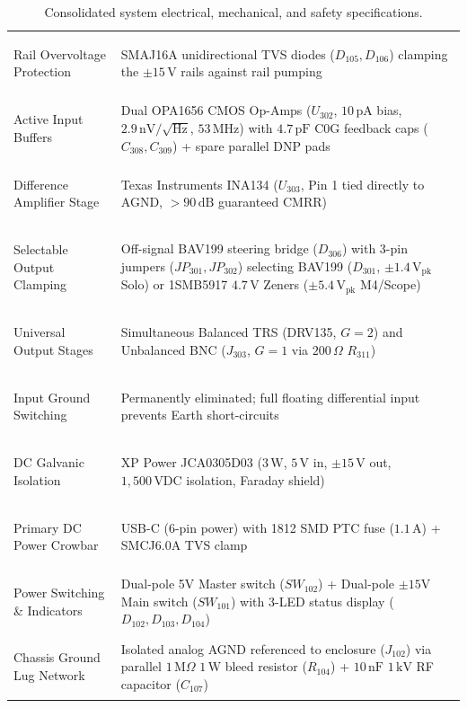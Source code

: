 \documentclass[11pt, letterpaper]{article}
\begin{document}
\begin{table}[H]
\begin{tabularx}{\linewidth}{@{} >{\bfseries\raggedright\arraybackslash}p{4.3cm} L @{}}
        Rail Overvoltage Protection & SMAJ16A unidirectional TVS diodes ($D_{105}, D_{106}$) clamping the $\pm 15\,\text{V}$ rails against rail pumping \\
        Active Input Buffers & Dual OPA1656 CMOS Op-Amps ($U_{302}$, $10\,\text{pA}$ bias, $2.9\,\text{nV}/\sqrt{\text{Hz}}$, $53\,\text{MHz}$) with $4.7\,\text{pF}$ C0G feedback caps ($C_{308}, C_{309}$) + spare parallel DNP pads \\
        Difference Amplifier Stage & Texas Instruments INA134 ($U_{303}$, Pin 1 tied directly to AGND, $>90\,\text{dB}$ guaranteed CMRR) \\
        Selectable Output Clamping & Off-signal BAV199 steering bridge ($D_{306}$) with 3-pin jumpers ($JP_{301}, JP_{302}$) selecting BAV199 ($D_{301}$, $\pm 1.4\,\text{V}_{\text{pk}}$ Solo) or 1SMB5917 $4.7\,\text{V}$ Zeners ($\pm 5.4\,\text{V}_{\text{pk}}$ M4/Scope) \\
        Universal Output Stages & Simultaneous Balanced TRS (DRV135, $G=2$) and Unbalanced BNC ($J_{303}$, $G=1$ via $200\,\Omega$ $R_{311}$) \\
        Input Ground Switching & Permanently eliminated; full floating differential input prevents Earth short-circuits \\
        DC Galvanic Isolation & XP Power JCA0305D03 ($3\,\text{W}$, $5\,\text{V}$ in, $\pm 15\,\text{V}$ out, $1,500\,\text{VDC}$ isolation, Faraday shield) \\
        Primary DC Power Crowbar & USB-C (6-pin power) with 1812 SMD PTC fuse ($1.1\,\text{A}$) + SMCJ6.0A TVS clamp \\
        Power Switching \& Indicators & Dual-pole 5V Master switch ($SW_{102}$) + Dual-pole $\pm 15$V Main switch ($SW_{101}$) with 3-LED status display ($D_{102}, D_{103}, D_{104}$) \\
        Chassis Ground Lug Network & Isolated analog AGND referenced to enclosure ($J_{102}$) via parallel $1\,\text{M}\Omega$ $1\,\text{W}$ bleed resistor ($R_{104}$) + $10\,\text{nF}$ $1\,\text{kV}$ RF capacitor ($C_{107}$) \\
        \bottomrule
    \end{tabularx}
    \caption{Consolidated system electrical, mechanical, and safety specifications.}
    \label{tab:system_specs}
\end{table}

\newpage

\end{document}
